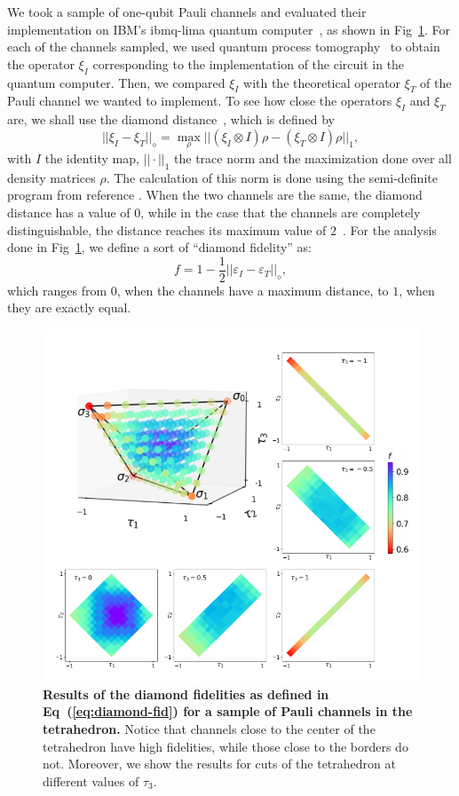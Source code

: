 \documentclass[10pt,letterpaper]{article} %
\newcommand{\fref}[1]{Fig~\ref{#1}}
\newcommand{\eref}[1]{Eq~(\ref{#1})}
\begin{document}
We took a sample of one-qubit Pauli channels
and evaluated their implementation on IBM's
ibmq-lima quantum computer~\cite{Qiskit},
as shown in \fref{Fig3}. 
For each of the channels sampled, we used 
quantum process tomography~\cite{Qiskit, Chuang:1996} to obtain the 
operator $\xi_I$ corresponding to the implementation of the
circuit in the quantum computer. 
Then, we compared $\xi_I$ with the theoretical 
operator $\xi_T$ of the Pauli channel we wanted to implement.
To see how close the operators $\xi_I$ and 
$\xi_T$ are, we shall use the
diamond distance~\cite{wildebook}, which is defined by
\begin{equation}
||\xi_I - \xi_T ||_{\diamond}  = \max_{\rho} || (\xi_I \otimes I) \rho - (\xi_T \otimes I) \rho ||_1,
\end{equation}
with $I$ the identity map,
$|| \cdot ||_1$ the trace norm and the maximization
done over all density matrices $\rho$.
The calculation of this norm is done using the semi-definite program from reference \cite{Watrous}.
When the two channels are the same,
the diamond distance has a value of $0$, while in the case that the channels
are completely distinguishable, the distance reaches its maximum value of $2$~\cite{Benenti}.
For the analysis done in \fref{Fig3}, we define a sort of ``diamond fidelity'' as: 
\begin{equation}
f = 1 - \dfrac{1}{2} ||\varepsilon_I - \varepsilon_T ||_{\diamond},
\label{eq:diamond-fid}
\end{equation}
which ranges from $0$, when the channels have a maximum distance, to  $1$,
when they are exactly equal.

\begin{figure} %
\centering
\includegraphics{fig-tetra.pdf}
\caption{{\bf Results of the diamond fidelities as defined in \eref{eq:diamond-fid}
for a sample of Pauli channels in the tetrahedron.}  Notice that channels close
to the center of the tetrahedron have high fidelities, while those close to the
borders do not.  Moreover, we show the results for cuts of the tetrahedron at
different values of $\tau_3$.}
\label{Fig3}
\end{figure} %
\end{document}
